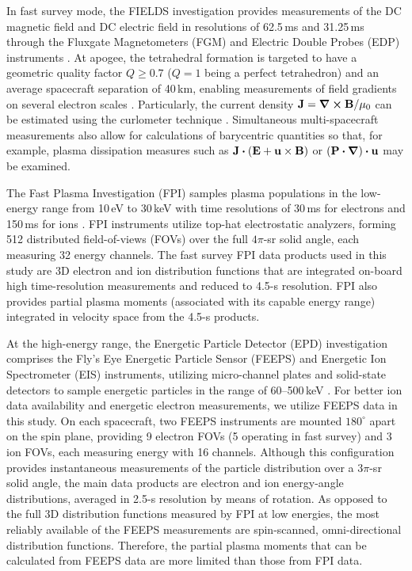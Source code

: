 \documentclass[draft]{agujournal2019}
\begin{document}
In fast survey mode, the FIELDS investigation provides measurements of the DC magnetic field and DC electric field in resolutions of 62.5\,\si{ms} and 31.25\,\si{ms} through the Fluxgate Magnetometers (FGM) and Electric Double Probes (EDP) instruments \cite{Torbert2016,Russell2016,Ergun2016}. At apogee, the tetrahedral formation is targeted to have a geometric quality factor ${Q\geq 0.7}$ (${Q=1}$ being a perfect tetrahedron) and an average spacecraft separation of 40\,\si{km}, enabling measurements of field gradients on several electron scales \cite{Fuselier2016}. Particularly, the current density ${\vb{J}=\curl{\vb{B}}/\mu_0}$ can be estimated using the curlometer technique \cite{Paschmann1998,Dunlop2021}. Simultaneous multi-spacecraft measurements also allow for calculations of barycentric quantities so that, for example, plasma dissipation measures such as ${\vb{J}\vdot\qty(\vb{E}+\vb{u}\times\vb{B})}$ \cite{Zenitani2005,Ergun2018} or ${\qty(\vb{P}\vdot\grad)\vdot\vb{u}}$ \cite{Chasapis2018,Yang2022} may be examined.

The Fast Plasma Investigation (FPI) samples plasma populations in the low-energy range from 10\,\si{eV} to 30\,\si{keV} with time resolutions of 30\,\si{ms} for electrons and 150\,\si{ms} for ions \cite{Pollock2016}. FPI instruments utilize top-hat electrostatic analyzers, forming 512 distributed field-of-views (FOVs) over the full $4\pi$-\si{sr} solid angle, each measuring 32 energy channels. The fast survey FPI data products used in this study are 3D electron and ion distribution functions that are integrated on-board high time-resolution measurements and reduced to 4.5-\si{s} resolution. FPI also provides partial plasma moments (associated with its capable energy range) integrated in velocity space from the 4.5-\si{s} products.

At the high-energy range, the Energetic Particle Detector (EPD) investigation comprises the Fly's Eye Energetic Particle Sensor (FEEPS) and Energetic Ion Spectrometer (EIS) instruments, utilizing micro-channel plates and solid-state detectors to sample energetic particles in the range of 60--500\,\si{keV} \cite{Mauk2016,Blake2016}. For better ion data availability and energetic electron measurements, we utilize FEEPS data in this study. On each spacecraft, two FEEPS instruments are mounted $180^\circ$ apart on the spin plane, providing 9 electron FOVs (5 operating in fast survey) and 3 ion FOVs, each measuring energy with 16 channels. Although this configuration provides instantaneous measurements of the particle distribution over a $3\pi$-\si{sr} solid angle, the main data products are electron and ion energy-angle distributions, averaged in 2.5-\si{s} resolution by means of rotation. As opposed to the full 3D distribution functions measured by FPI at low energies, the most reliably available of the FEEPS measurements are spin-scanned, omni-directional distribution functions. Therefore, the partial plasma moments that can be calculated from FEEPS data are more limited than those from FPI data.
\end{document}
